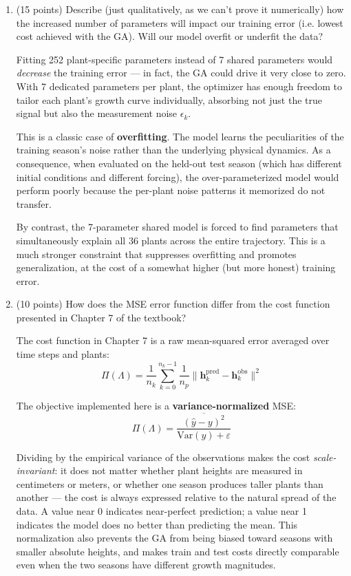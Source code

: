 \documentclass{article}
\begin{document}
\begin{enumerate}
\item[2. (a)]  (15 points) Describe (just qualitatively, as we can't prove it numerically) how the increased number of parameters will impact our training error (i.e. lowest cost achieved with the GA). Will our model overfit or underfit the data?

\begin{answer}
Fitting 252 plant-specific parameters instead of 7 shared parameters would \textit{decrease} the training error — in fact, the GA could drive it very close to zero. With 7 dedicated parameters per plant, the optimizer has enough freedom to tailor each plant's growth curve individually, absorbing not just the true signal but also the measurement noise $\epsilon_k$.

This is a classic case of \textbf{overfitting}. The model learns the peculiarities of the training season's noise rather than the underlying physical dynamics. As a consequence, when evaluated on the held-out test season (which has different initial conditions and different forcing), the over-parameterized model would perform poorly because the per-plant noise patterns it memorized do not transfer.

By contrast, the 7-parameter shared model is forced to find parameters that simultaneously explain all 36 plants across the entire trajectory. This is a much stronger constraint that suppresses overfitting and promotes generalization, at the cost of a somewhat higher (but more honest) training error.
\end{answer}

\item[2. (b)] (10 points) How does the MSE error function differ from the cost function presented in Chapter 7 of the textbook?

\begin{answer}
The cost function in Chapter 7 is a raw mean-squared error averaged over time steps and plants:
\[
\Pi(\Lambda) = \frac{1}{n_k}\sum_{k=0}^{n_k-1} \frac{1}{n_p}\|\mathbf{h}^\text{pred}_k - \mathbf{h}^\text{obs}_k\|^2
\]

The objective implemented here is a \textbf{variance-normalized} MSE:
\[
\Pi(\Lambda) = \frac{\overline{(\hat{y} - y)^2}}{\text{Var}(y) + \varepsilon}
\]

Dividing by the empirical variance of the observations makes the cost \textit{scale-invariant}: it does not matter whether plant heights are measured in centimeters or meters, or whether one season produces taller plants than another — the cost is always expressed relative to the natural spread of the data. A value near 0 indicates near-perfect prediction; a value near 1 indicates the model does no better than predicting the mean. This normalization also prevents the GA from being biased toward seasons with smaller absolute heights, and makes train and test costs directly comparable even when the two seasons have different growth magnitudes.
\end{answer}


\end{enumerate}
\end{document}
